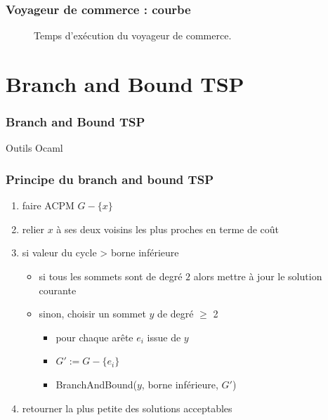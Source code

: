 \documentclass[french]{beamer}
\begin{document}
\begin{frame}
\frametitle{Voyageur de commerce : courbe}
\begin{figure}[h!]
\centering
{}
\caption{Temps d'exécution du voyageur de commerce.}
\end{figure}
\end{frame}

\section{Branch and Bound TSP}

\begin{frame}
  \frametitle{Branch and Bound TSP}
  \begin{block}{Outils}
Ocaml
  \end{block}
\end{frame}

\begin{frame}
\frametitle{Principe du branch and bound TSP}
\begin{enumerate}
 \item faire ACPM $G - \{x \}$
  \item relier $x$ à ses deux voisins les plus proches en terme de coût
  \item si {valeur du cycle > borne inférieure}
   \begin{itemize}
\item si {tous les sommets sont de degré $2$} alors mettre à jour le solution courante
\item sinon, choisir un sommet $y$ de degré $\geq$ 2
\begin{itemize}
\item  pour {chaque arête $e_i$ issue de $y$}
\item  $G' := G - \{ e_i \}$
\item BranchAndBound($y$, borne inférieure, $G'$)
\end{itemize}
\end{itemize}
    \item retourner la plus petite des solutions acceptables
\end{enumerate}

\end{frame}
\end{document}
